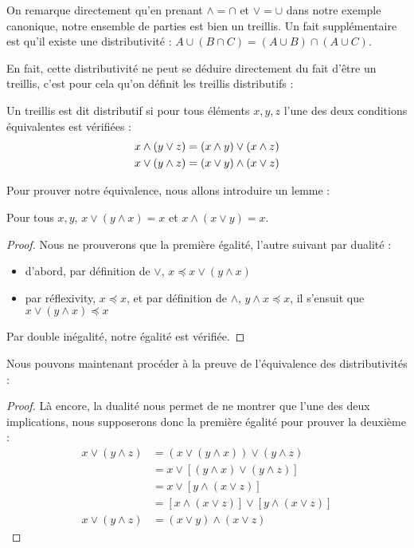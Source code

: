 \begin{expl}
    On remarque directement qu'en prenant $\wedge = \cap$ et $\vee = \cup$ dans notre exemple canonique, notre ensemble de parties est bien un treillis. Un fait supplémentaire est qu'il existe une distributivité : $A\cup(B\cap C) = (A\cup B)\cap(A\cup C)$.
\end{expl}

En fait, cette distributivité ne peut se déduire directement du fait d'être un treillis, c'est pour cela qu'on définit les treillis distributifs :

\begin{defi}
    Un treillis est dit distributif si pour tous éléments $x,y,z$ l'une des deux conditions équivalentes est vérifiées :
        \begin{align*}
            x\wedge(y\vee z) &= (x\wedge y)\vee(x\wedge z)\vspace{0.5cm}\\
            x\vee(y\wedge z) &= (x\vee y)\wedge(x \vee z)
        \end{align*}
\end{defi}

Pour prouver notre équivalence, nous allons introduire un lemme :

\begin{lem}
    Pour tous $x,y$, $x\vee (y\wedge x) = x$ et $x\wedge(x\vee y) = x$.
\end{lem}
\begin{proof}
    Nous ne prouverons que la première égalité, l'autre suivant par dualité :
    \begin{itemize}[label=$\bullet$]
        \item d'abord, par définition de $\vee$, $x\preceq x\vee (y\wedge x)$
        \item par réflexivity, $x\preceq x$, et par définition de $\wedge$, $y\wedge x \preceq x$, il s'ensuit que $x\vee (y\wedge x) \preceq x$
    \end{itemize}
    Par double inégalité, notre égalité est vérifiée.
\end{proof}

Nous pouvons maintenant procéder à la preuve de l'équivalence des distributivités :

\begin{proof}
    Là encore, la dualité nous permet de ne montrer que l'une des deux implications, nous supposerons donc la première égalité pour prouver la deuxième :
    \begin{align*}
        x\vee(y\wedge z) &= (x\vee(y\wedge x)) \vee (y\wedge z)\\
        &= x\vee [(y\wedge x)\vee (y\wedge z)]\\
        &= x\vee [y\wedge(x\vee z)]\\
        &= [x\wedge (x\vee z)] \vee [y\wedge(x\vee z)]\\
        x\vee (y\wedge z) &= (x\vee y) \wedge (x\vee z)
    \end{align*}
\end{proof}

